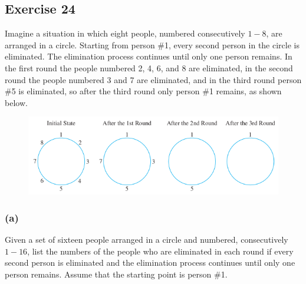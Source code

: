 \documentclass[14pt]{extarticle}
\begin{document}
\subsection{Exercise 24}
Imagine a situation in which eight people, numbered consecutively $1-8$, are arranged in a circle. Starting from person \#1, every second person in the circle is eliminated. The elimination process continues until only one person remains. In the first round the people numbered 2, 4, 6, and 8 are eliminated, in the second round the people numbered 3 and 7 are eliminated, and in the third round person \#5 is eliminated, so after the third round only person \#1 remains, as shown below.

\begin{figure}[ht!]
\centering
\includegraphics[scale=0.5]{../images/5.4.24.png}
\end{figure}

\subsubsection{(a)}
Given a set of sixteen people arranged in a circle and numbered, consecutively $1-16$, list the numbers of the people who are eliminated in each round if every second person is eliminated and the elimination process continues
until only one person remains. Assume that the starting point is person \#1.
\end{document}
